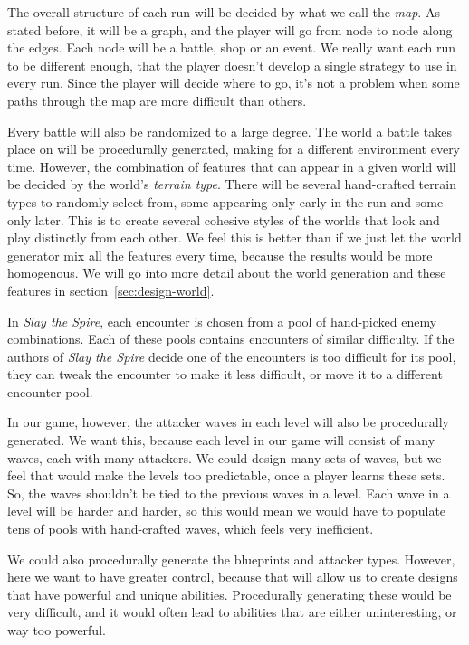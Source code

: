 \begin{notindemo}
    The overall structure of each run will be decided by what we call the \emph{map}.
    As stated before, it will be a graph, and the player will go from node to node along the edges.
    Each node will be a battle, shop or an event.
    We really want each run to be different enough, that the player doesn't develop a single strategy to use in every run.
    Since the player will decide where to go, it's not a problem when some paths through the map are more difficult than others.
\end{notindemo}

Every battle will also be randomized to a large degree.
The world a battle takes place on will be procedurally generated, making for a different environment every time.
However, the combination of features that can appear in a given world will be decided by the world's \emph{terrain type}.
There will be several hand-crafted terrain types to randomly select from, some appearing only early in the run and some only later.
This is to create several cohesive styles of the worlds that look and play distinctly from each other.
We feel this is better than if we just let the world generator mix all the features every time, because the results would be more homogenous.
We will go into more detail about the world generation and these features in section~\ref{sec:design-world}.

In \emph{Slay the Spire}, each encounter is chosen from a pool of hand-picked enemy combinations.
Each of these pools contains encounters of similar difficulty.
If the authors of \emph{Slay the Spire} decide one of the encounters is too difficult for its pool, they can tweak the encounter to make it less difficult, or move it to a different encounter pool.

In our game, however, the attacker waves in each level will also be procedurally generated.
We want this, because each level in our game will consist of many waves, each with many attackers.
We could design many sets of waves, but we feel that would make the levels too predictable, once a player learns these sets.
So, the waves shouldn't be tied to the previous waves in a level.
Each wave in a level will be harder and harder, so this would mean we would have to populate tens of pools with hand-crafted waves, which feels very inefficient.

We could also procedurally generate the blueprints and attacker types.
However, here we want to have greater control, because that will allow us to create designs that have powerful and unique abilities.
Procedurally generating these would be very difficult, and it would often lead to abilities that are either uninteresting, or way too powerful.

